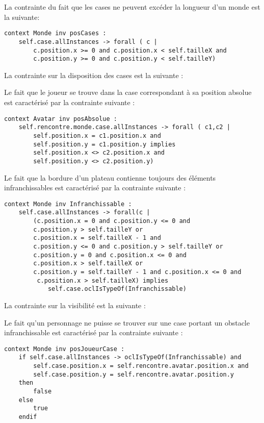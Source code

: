 La contrainte du fait que les cases ne peuvent excéder la longueur d'un monde est la suivante:

\begin{lstlisting}[caption=Contrainte sur la position des cases,captionpos=b,label={lst:casePos},language=OCL]
context Monde inv posCases :
	self.case.allInstances -> forall ( c |
		c.position.x >= 0 and c.position.x < self.tailleX and
		c.position.y >= 0 and c.position.y < self.tailleY)
\end{lstlisting}

La contrainte  sur la disposition des cases est la suivante :


Le fait que le joueur se trouve dans la case correspondant à sa position absolue est caractérisé par la contrainte suivante :

\begin{lstlisting}[caption=Contrainte sur la position du joueur,captionpos=b,label={lst:posJoueur},language=OCL]
context Avatar inv posAbsolue :
	self.rencontre.monde.case.allInstances -> forall ( c1,c2 |
		self.position.x = c1.position.x and 
		self.position.y = c1.position.y implies
		self.position.x <> c2.position.x and 
		self.position.y <> c2.position.y)
\end{lstlisting}

Le fait que la bordure d'un plateau contienne toujours des éléments infranchissables est caractérisé par la contrainte suivante :

\begin{lstlisting}[caption=Contrainte sur la bordure du plateau,captionpos=b,label={lst:bordurePlat},language=OCL]
context Monde inv Infranchissable :
	self.case.allInstances -> forall(c |
		(c.position.x = 0 and c.position.y <= 0 and 
		c.position.y > self.tailleY or
		c.position.x = self.tailleX - 1 and 
		c.position.y <= 0 and c.position.y > self.tailleY or
		c.position.y = 0 and c.position.x <= 0 and 
		c.position.x > self.tailleX or
		c.position.y = self.tailleY - 1 and c.position.x <= 0 and
		 c.position.x > self.tailleX) implies
			self.case.oclIsTypeOf(Infranchissable)
\end{lstlisting}

La contrainte sur la visibilité est la suivante :

Le fait qu'un personnage ne puisse se trouver sur une case portant un obstacle infranchissable est caractérisé par la contrainte suivante :

\begin{lstlisting}[caption=Contrainte sur la position du joueur sur case infranchissable,captionpos=b,label={lst:caseInfranchissable},language=OCL]
context Monde inv posJoueurCase :
	if self.case.allInstances -> oclIsTypeOf(Infranchissable) and
		self.case.position.x = self.rencontre.avatar.position.x and
		self.case.position.y = self.rencontre.avatar.position.y
	then
		false
	else
		true
	endif
\end{lstlisting}

